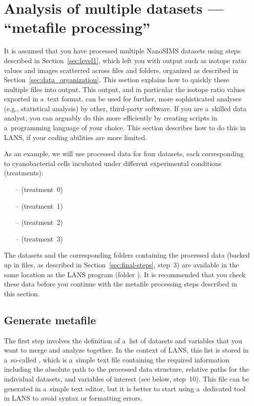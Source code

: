 \section{Analysis of multiple datasets --- ``metafile processing''}
\label{sec:level2}

\purplebox{}
It is assumed that you have processed multiple NanoSIMS datasets using steps described in Section~\ref{sec:level1}, which left you with output such as isotope ratio values and images scatterred across  files and folders, organized as described in Section~\ref{sec:data_organization}. This section explains how to quickly  these multiple files into  output. This output, and in particular the isotope ratio values exported in a~text format, can be used for further, more sophisticated analyses (e.g., statistical analysis) by other, third-party software. If you are a~skilled data analyst, you can arguably do this more efficiently by creating scripts in a~programming language of your choice. This section describes how to do this in LANS, if your coding abilities are more limited.
\tcbe

As an example, we will use processed data for four datasets, each corresponding to cyanobacterial cells incubated under different experimental conditions (treatments): 
\begin{itemize}
\item[--] (treatment~0)
\item[--] (treatment~1)
\item[--] (treatment~2)
\item[--] (treatment~3)
\end{itemize}
The datasets and the corresponding folders containing the processed data (backed up in  files, as described in Section~\ref{sec:final-steps}, step~3) are available in the same location as the LANS program (folder ). It is recommended that you check these data before you continue with the metafile processing steps described in this section.


\subsection{Generate metafile}
\setcounter{step}{0}

\goldbox{}
The first step involves the definition of a~list of datasets and variables that you want to merge and analyze together. In the context of LANS, this list is stored in a~so-called , which is a~simple text file containing the required information including the absolute path to the processed data structure, relative paths for the individual datasets, and variables of interest (see below, step~10). This file can be generated in a~simple text editor, but it is better to start using a~dedicated tool in LANS to avoid syntax or formatting errors.
\tcbe

